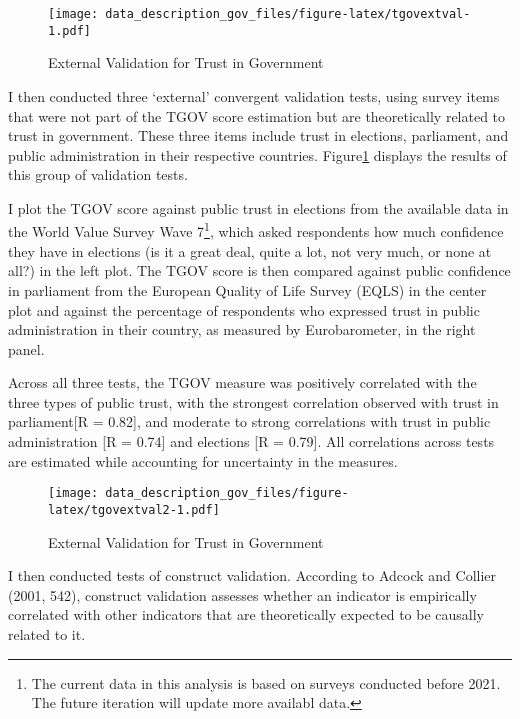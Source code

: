 \documentclass[
  12pt,
]{article}
\begin{document}
\begin{figure}
\centering
\texttt{[image: data\_description\_gov\_files/figure-latex/tgovextval-1.pdf]}
\caption{\label{fig:tgovextval}External Validation for Trust in Government \label{tgov_ev1}}
\end{figure}

I then conducted three `external' convergent validation tests, using survey items that were not part of the TGOV score estimation but are theoretically related to trust in government.
These three items include trust in elections, parliament, and public administration in their respective countries.
Figure\nobreakspace{}\ref{tgov_ev1} displays the results of this group of validation tests.

I plot the TGOV score against public trust in elections from the available data in the World Value Survey Wave 7\footnote{The current data in this analysis is based on surveys conducted before 2021. The future iteration will update more availabl data.}, which asked respondents how much confidence they have in elections (is it a great deal, quite a lot, not very much, or none at all?) in the left plot.
The TGOV score is then compared against public confidence in parliament from the European Quality of Life Survey (EQLS) in the center plot and against the percentage of respondents who expressed trust in public administration in their country, as measured by Eurobarometer, in the right panel.

Across all three tests, the TGOV measure was positively correlated with the three types of public trust, with the strongest correlation observed with trust in parliament{[}R = 0.82{]}, and moderate to strong correlations with trust in public administration {[}R = 0.74{]} and elections {[}R = 0.79{]}.
All correlations across tests are estimated while accounting for uncertainty in the measures.

\begin{figure}
\centering
\texttt{[image: data\_description\_gov\_files/figure-latex/tgovextval2-1.pdf]}
\caption{\label{fig:tgovextval2}External Validation for Trust in Government \label{tgov_ev2}}
\end{figure}

I then conducted tests of construct validation.
According to Adcock and Collier (2001, 542), construct validation assesses whether an indicator is empirically correlated with other indicators that are theoretically expected to be causally related to it.
\end{document}
